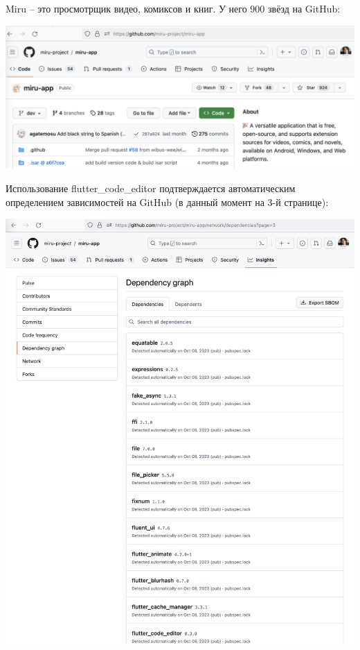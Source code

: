 
Miru -- это просмотрщик видео, комиксов и книг.
У него 900 звёзд на GitHub:

\begin{center}
    \includegraphics[width=\textwidth]{stars}
\end{center}

Использование flutter\_code\_editor подтверждается автоматическим определением зависимостей на GitHub
(в данный момент на 3-й странице):

\begin{center}
    \includegraphics[width=\textwidth]{dependencies}
\end{center}

\pagebreak

